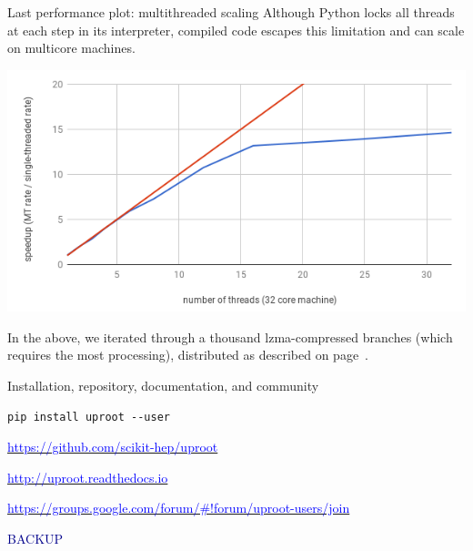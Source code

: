 \documentclass[aspectratio=169]{beamer}
\begin{document}
\begin{frame}{Last performance plot: multithreaded scaling}
\vspace{0.5 cm}
Although Python locks all threads at each step in its interpreter, compiled code escapes this limitation and can scale on multicore machines.

\begin{center}
\includegraphics[width=0.65\linewidth]{scaling.png}
\end{center}

In the above, we iterated through a thousand lzma-compressed branches (which requires the most processing), distributed as described on page~\pageref{page:executor}.
\end{frame}

\begin{frame}[fragile]{Installation, repository, documentation, and community}
\vspace{0.5 cm}
\huge
\begin{center}
\begin{minipage}{0.8\linewidth}
\begin{verbatim}
pip install uproot --user
\end{verbatim}
\end{minipage}

\Large
\vspace{1 cm}
\href{https://github.com/scikit-hep/uproot}{\textcolor{blue}{https://github.com/scikit-hep/uproot}}

\vspace{0.5 cm}
\href{http://uproot.readthedocs.io}{\textcolor{blue}{http://uproot.readthedocs.io}}

\vspace{0.5 cm}
\href{https://groups.google.com/forum/#!forum/uproot-users/join}{\textcolor{blue}{https://groups.google.com/forum/\#!forum/uproot-users/join}}
\end{center}
\end{frame}

\begin{frame}{}
\begin{center}
\Huge \textcolor{darkblue}{BACKUP}
\end{center}
\end{frame}
\end{document}

